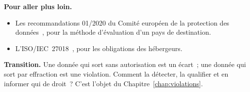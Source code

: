 \bigskip

\begin{boxinfo}
\textbf{Pour aller plus loin.}
\begin{itemize}
    \item Les recommandations 01/2020 du Comité européen de la protection des
          données~\cite{edpb2020transferts}, pour la méthode d'évaluation
          d'un pays de destination.
    \item L'ISO/IEC~27018~\cite{iso27018}, pour les obligations des
          hébergeurs.
\end{itemize}
\end{boxinfo}

\begin{boxinfo}
\textbf{Transition.} Une donnée qui sort sans autorisation est un écart~;
une donnée qui sort par effraction est une violation. Comment la détecter,
la qualifier et en informer qui de droit~? C'est l'objet du
Chapitre~\ref{chap:violations}.
\end{boxinfo}
